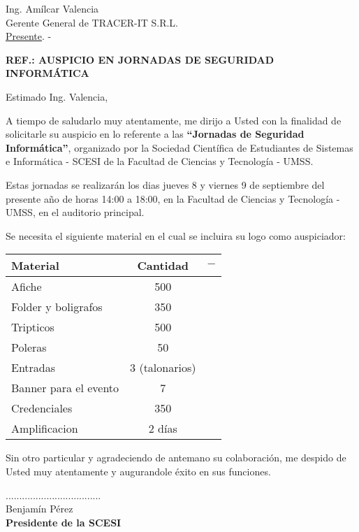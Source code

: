\documentclass[letterpaper,12pt]{letter}
\begin{document}
\date {11 de agosto de 2011}

\begin{letter}{Ing. Amílcar Valencia \\ Gerente General de TRACER-IT S.R.L. \\\underline {Presente}. -}

\begin{center}
	\opening{\textbf{REF.: AUSPICIO EN JORNADAS DE SEGURIDAD INFORM\'ATICA}}
\end{center}

Estimado Ing. Valencia,

A tiempo de saludarlo muy atentamente, me dirijo a Usted con la finalidad de solicitarle su auspicio en lo referente 
a las {\bfseries ``Jornadas de Seguridad Inform\'atica''}, organizado por la Sociedad Cient\'ifica de Estudiantes de 
Sistemas e Inform\'atica - SCESI de la Facultad de Ciencias y Tecnolog\'ia - UMSS.

Estas jornadas se realizar\'an los dias jueves 8 y viernes 9 de septiembre del presente a\~no de horas 14:00 a 
18:00, en la Facultad de Ciencias y Tecnolog\'ia - UMSS, en el auditorio principal.

Se necesita el siguiente material en el cual se incluira su logo como auspiciador:

\begin{tabular}{|l|c|c|}
\hline
{\bfseries Material} & {\bfseries Cantidad} & $-$ \\
\hline
Afiche & 500 & \\
\hline
Folder y boligrafos & 350 & \\
\hline
Tripticos & 500 & \\
\hline
Poleras & 50 & \\
\hline
Entradas & 3 (talonarios) & \\
\hline
Banner para el evento & 7 & \\
\hline
Credenciales & 350 & \\
\hline
Amplificacion & 2 d\'ias & \\
\hline
\end{tabular}

Sin otro particular y agradeciendo de antemano su colaboraci\'on, me despido de Usted muy atentamente y augurandole \'exito en sus funciones.\\

\vspace{1cm}

\begin{center}
...................................\\
Benjam\'in P\'erez\\
{\bfseries Presidente de la  SCESI}
\end{center}

\end{letter}
\end{document}
